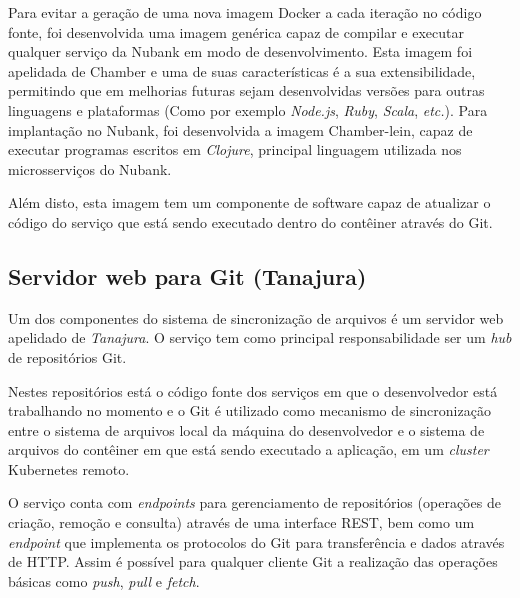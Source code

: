	Para evitar a geração de uma nova imagem Docker a cada iteração no código fonte, foi desenvolvida uma imagem genérica capaz de compilar e executar qualquer serviço da Nubank em modo de desenvolvimento. Esta imagem foi apelidada de Chamber e uma de suas características é a sua extensibilidade, permitindo que em melhorias futuras sejam desenvolvidas versões para outras linguagens e plataformas (Como por exemplo \textit{Node.js}, \textit{Ruby}, \textit{Scala}, \textit{etc.}). Para implantação no Nubank, foi desenvolvida a imagem Chamber-lein, capaz de executar programas escritos em \textit{Clojure}, principal linguagem utilizada nos microsserviços do Nubank.
	
	Além disto, esta imagem tem um componente de software capaz de atualizar o código do serviço que está sendo executado dentro do contêiner através do Git.
	
	
	\subsection{Servidor web para Git (Tanajura)}
	Um dos componentes do sistema de sincronização de arquivos é um servidor web apelidado de \textit{Tanajura}. O serviço tem como principal responsabilidade ser um \textit{hub} de repositórios Git.
	
	Nestes repositórios está o código fonte dos serviços em que o desenvolvedor está trabalhando no momento e o Git é utilizado como mecanismo de sincronização entre o sistema de arquivos local da máquina do desenvolvedor e o sistema de arquivos do contêiner em que está sendo executado a aplicação, em um \textit{cluster} Kubernetes remoto.
	
	O serviço conta com \textit{endpoints} para gerenciamento de repositórios (operações de criação, remoção e consulta) através de uma interface REST, bem como um \textit{endpoint} que implementa os protocolos do Git para transferência e dados através de HTTP. Assim é possível para qualquer cliente Git a realização das operações básicas como \textit{push}, \textit{pull} e \textit{fetch}.
	
